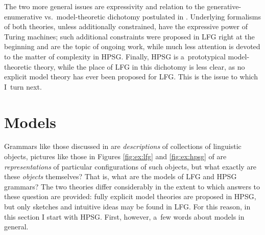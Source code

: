 \documentclass[output=paper,hidelinks]{langscibook}
\begin{document}
The two more general issues are expressivity and relation to the generative\hyp{}enumerative vs.\ model\hyp{}theoretic dichotomy postulated in \citet{pullum2001distinction}. Underlying formalisms of both theories, unless additionally constrained, have the expressive power of Turing machines; such additional constraints were proposed in LFG right at the beginning and are the topic of ongoing work, while much less attention is devoted to the matter of complexity in HPSG\@.  Finally, HPSG is a~prototypical model\hyp{}theoretic theory, while the place of LFG in this dichotomy is less clear, as no explicit model theory has ever been proposed for LFG\@.  This is the issue to which I~turn next.


\section{Models}
\label{sec:mod}

Grammars like those discussed in  are \emph{descriptions} of collections of linguistic objects, pictures like those in Figures \ref{fig:ex:lfg} and \ref{fig:ex:hpsg} of  are \emph{representations} of particular configurations of such objects, but what exactly are these \emph{objects} themselves?  That is, what are the models of LFG and HPSG grammars?  The two theories differ considerably in the extent to which answers to these question are provided: fully explicit model theories are proposed in HPSG, but only sketches and intuitive ideas may be found in LFG\@.  For this reason, in this section I start with HPSG\@.  First, however, a~few words about models in general.
\end{document}
